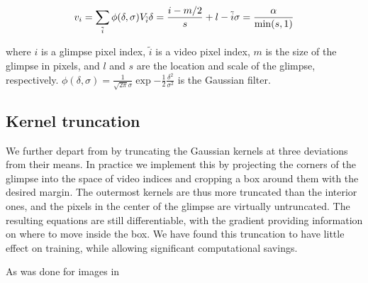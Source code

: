 \documentclass{article} %
\begin{document}
\begin{equation}
v_i = \sum_{\tilde{i}} \phi(\delta,\sigma) V_{\tilde{i}} \\
\delta =  \frac{i - m/2}{s} + l - \tilde{i} \\
\sigma =  \frac{\alpha}{\min(s, 1)}
\end{equation}

where $i$ is a glimpse pixel index, $\tilde{i}$ is a video pixel index, $m$ is the size of the glimpse in pixels, and $l$ and $s$ are the location and scale of the glimpse, respectively.
$\phi( \delta, \sigma ) = \frac{1}{\sqrt{2 \pi}\sigma} \exp{- \frac{1}{2} \frac{\delta^2}{\sigma^2}}$ is the Gaussian filter.

\subsection{Kernel truncation}

We further depart from \cite{draw} by truncating the Gaussian kernels at three deviations from their means.
In practice we implement this by projecting the corners of the glimpse into the space of video indices and cropping a box around them with the desired margin.
The outermost kernels are thus more truncated than the interior ones, and the pixels in the center of the glimpse are virtually untruncated.
The resulting equations are still differentiable, with the gradient providing information on where to move inside the box.
We have found this truncation to have little effect on training, while allowing significant computational savings.

As was done for images in \cite{Mnih2014} \cite{Ba2014}
\end{document}
